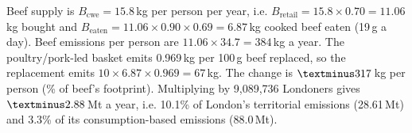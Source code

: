 Beef supply is $B_{\mathrm{cwe}}=15.8$\,kg per person per year, i.e. $B_{\mathrm{retail}} = 15.8\times0.70 = 11.06$\,kg bought and $B_{\mathrm{eaten}} = 11.06\times0.90\times0.69 = 6.87$\,kg cooked beef eaten (19\,g a day). Beef emissions per person are $11.06\times34.7 = 384$\,kg \COtwoe{} a year. The poultry/pork-led basket emits 0.969\,kg \COtwoe{} per 100\,g beef replaced, so the replacement emits $10\times6.87\times0.969 = 67$\,kg. The change is $\textminus 317$\,kg per person (\% of beef's footprint). Multiplying by 9{,}089{,}736 Londoners gives $\textminus 2.88$\,Mt \COtwoe{} a year, i.e. 10.1\% of London's territorial emissions (28.61\,Mt) and 3.3\% of its consumption-based emissions (88.0\,Mt).
